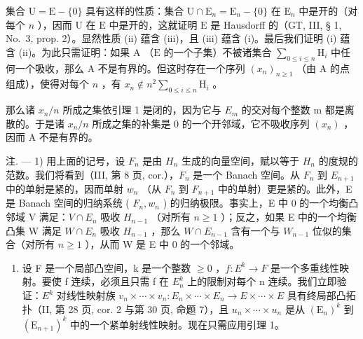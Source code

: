 集合 \(\mathrm{U} = \mathrm{E} - \{0\}\) 具有这样的性质：集合 \(\mathrm{U} \cap \mathrm{E}_n = \mathrm{E}_n - \{0\}\) 在 \(\mathrm{E}_n\) 中是开的（对每个 \(n\) ），因而 \(\mathrm{U}\) 在 \(\mathrm{E}\) 中是开的，这就证明 \(\mathrm{E}\) 是 Hausdorff 的（GT, III, § 1, No.~3, prop. 2）。显然性质 (ii) 蕴含 (iii)，且 (iii) 蕴含 (i)。最后我们证明 (i) 蕴含 (ii)。为此只需证明：如果 \(\mathrm{A}\) （\(\mathrm{E}\) 的一个子集）不被诸集合 \(\sum_{0 \leqslant i \leqslant n} \mathrm{H}_i\) 中任何一个吸收，那么 \(\mathrm{A}\) 不是有界的。但这时存在一个序列 \((x_n)_{n \geqslant 1}\) （由 \(\mathrm{A}\) 的点组成），使得对每个 \(n\) ，有 \(x_n \notin n^2 \sum_{0 \leqslant i \leqslant n} \mathrm{H}_i\) 。

那么诸 \(x_{n}/n\) 所成之集依引理 1 是闭的，因为它与 \(E_{m}\) 的交对每个整数 m 都是离散的。于是诸 \(x_{n}/n\) 所成之集的补集是 0 的一个开邻域，它不吸收序列 \((x_{n})\) ，因而 A 不是有界的。

注. --- 1) 用上面的记号，设 \(F_{n}\) 是由 \(H_{n}\) 生成的向量空间，赋以等于 \(H_{n}\) 的度规的范数。我们将看到（III, 第 8 页, cor.），\(F_{n}\) 是一个 Banach 空间。从 \(F_{n}\) 到 \(E_{n+1}\) 中的单射是紧的，因而单射 \(w_{n}\) （从 \(F_{n}\) 到 \(F_{n+1}\) 中的单射）更是紧的。此外，E 是 Banach 空间的归纳系统 ( \(F_{n}, w_{n}\) ) 的归纳极限。事实上，E 中 0 的一个均衡凸邻域 V 满足：\(V \cap E_{n}\) 吸收 \(H_{n-1}\) （对所有 \(n \geqslant 1\) ）；反之，如果 E 中的一个均衡凸集 W 满足 \(W \cap E_{n}\) 吸收 \(H_{n-1}\) ，那么 \(W \cap E_{n-1}\) 含有一个与 \(W_{n-1}\) 位似的集合（对所有 \(n \geqslant 1\) ），从而 W 是 E 中 0 的一个邻域。

\begin{enumerate}
\def\labelenumi{\arabic{enumi})}
\setcounter{enumi}{1}
\tightlist
\item
  设 F 是一个局部凸空间，k 是一个整数 \(\geqslant0\) ，\(f:E^{k}\rightarrow F\) 是一个多重线性映射。要使 f 连续，必须且只需 f 在 \(E_{n}^{k}\) 上的限制对每个 n 连续。我们立即验证：\(E^{k}\) 对线性映射族 \(v_{n}\times\cdots\times v_{n}:E_{n}\times\cdots\times E_{n}\to E\times\cdots\times E\) 具有终局部凸拓扑（II, 第 28 页, cor. 2 与第 30 页, 命题 7），且 \(u_{n}\times\cdots\times u_{n}\) 是从 \((\mathrm{E}_{n})^{k}\) 到 \((\mathrm{E}_{n+1})^{k}\) 中的一个紧单射线性映射。现在只需应用引理 1。
\end{enumerate}
\relax{}
